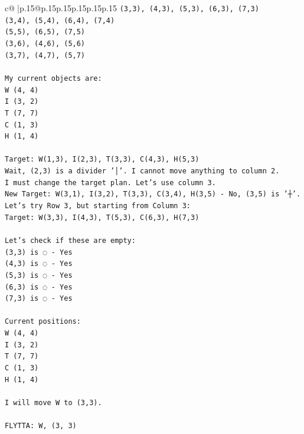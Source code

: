 \documentclass{article}
\begin{document}
{\begin{supertabular}{c@{$\;$}|p{.15\linewidth}@{}p{.15\linewidth}p{.15\linewidth}p{.15\linewidth}p{.15\linewidth}p{.15\linewidth}}
{{{\texttt{(3,3), (4,3), (5,3), (6,3), (7,3)} \\
\texttt{(3,4), (5,4), (6,4), (7,4)} \\
\texttt{(5,5), (6,5), (7,5)} \\
\texttt{(3,6), (4,6), (5,6)} \\
\texttt{(3,7), (4,7), (5,7)} \\
\\ 
\texttt{My current objects are:} \\
\texttt{W (4, 4)} \\
\texttt{I (3, 2)} \\
\texttt{T (7, 7)} \\
\texttt{C (1, 3)} \\
\texttt{H (1, 4)} \\
\\ 
\texttt{Target: W(1,3), I(2,3), T(3,3), C(4,3), H(5,3)} \\
\texttt{Wait, (2,3) is a divider '│'. I cannot move anything to column 2.} \\
\texttt{I must change the target plan. Let's use column 3.} \\
\texttt{New Target: W(3,1), I(3,2), T(3,3), C(3,4), H(3,5) {-} No, (3,5) is '┼'.} \\
\texttt{Let's try Row 3, but starting from Column 3:} \\
\texttt{Target: W(3,3), I(4,3), T(5,3), C(6,3), H(7,3)} \\
\\ 
\texttt{Let's check if these are empty:} \\
\texttt{(3,3) is ◌ {-} Yes} \\
\texttt{(4,3) is ◌ {-} Yes} \\
\texttt{(5,3) is ◌ {-} Yes} \\
\texttt{(6,3) is ◌ {-} Yes} \\
\texttt{(7,3) is ◌ {-} Yes} \\
\\ 
\texttt{Current positions:} \\
\texttt{W (4, 4)} \\
\texttt{I (3, 2)} \\
\texttt{T (7, 7)} \\
\texttt{C (1, 3)} \\
\texttt{H (1, 4)} \\
\\ 
\texttt{I will move W to (3,3).} \\
\\ 
\texttt{FLYTTA: W, (3, 3)} \\
}}}
\end{supertabular}}
\end{document}

